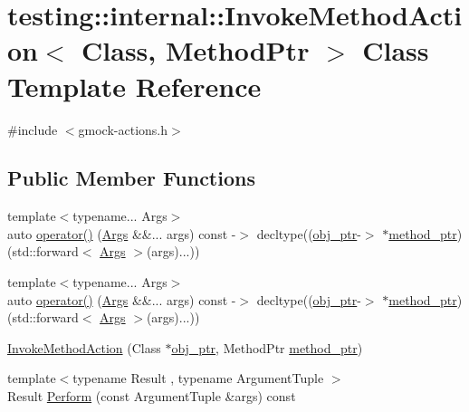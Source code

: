 \hypertarget{structtesting_1_1internal_1_1_invoke_method_action}{}\section{testing\+::internal\+::Invoke\+Method\+Action$<$ Class, Method\+Ptr $>$ Class Template Reference}
\label{structtesting_1_1internal_1_1_invoke_method_action}


{\ttfamily \#include $<$gmock-\/actions.\+h$>$}

\subsection*{Public Member Functions}
\begin{DoxyCompactItemize}
\item 
{\footnotesize template$<$typename... Args$>$ }\\auto \mbox{\hyperlink{structtesting_1_1internal_1_1_invoke_method_action_a152a1d71805ff44a9ad9fcd01a506eb8}{operator()}} (\mbox{\hyperlink{namespacetesting_aaca153f67b689b8b9d5b8c67ecf8cee4}{Args}} \&\&... args) const -\/$>$ decltype((\mbox{\hyperlink{structtesting_1_1internal_1_1_invoke_method_action_ae869b08a351641854e94380227affbc8}{obj\+\_\+ptr}}-\/$>$ $\ast$\mbox{\hyperlink{structtesting_1_1internal_1_1_invoke_method_action_a3101d543f56f7d010fac4d8eaa03acfb}{method\+\_\+ptr}})(std\+::forward$<$ \mbox{\hyperlink{namespacetesting_aaca153f67b689b8b9d5b8c67ecf8cee4}{Args}} $>$(args)...))
\item 
{\footnotesize template$<$typename... Args$>$ }\\auto \mbox{\hyperlink{structtesting_1_1internal_1_1_invoke_method_action_a152a1d71805ff44a9ad9fcd01a506eb8}{operator()}} (\mbox{\hyperlink{namespacetesting_aaca153f67b689b8b9d5b8c67ecf8cee4}{Args}} \&\&... args) const -\/$>$ decltype((\mbox{\hyperlink{structtesting_1_1internal_1_1_invoke_method_action_ae869b08a351641854e94380227affbc8}{obj\+\_\+ptr}}-\/$>$ $\ast$\mbox{\hyperlink{structtesting_1_1internal_1_1_invoke_method_action_a3101d543f56f7d010fac4d8eaa03acfb}{method\+\_\+ptr}})(std\+::forward$<$ \mbox{\hyperlink{namespacetesting_aaca153f67b689b8b9d5b8c67ecf8cee4}{Args}} $>$(args)...))
\item 
\mbox{\hyperlink{structtesting_1_1internal_1_1_invoke_method_action_a16e545f6166e2d54eeafdc2ab3adf06b}{Invoke\+Method\+Action}} (Class $\ast$\mbox{\hyperlink{structtesting_1_1internal_1_1_invoke_method_action_ae869b08a351641854e94380227affbc8}{obj\+\_\+ptr}}, Method\+Ptr \mbox{\hyperlink{structtesting_1_1internal_1_1_invoke_method_action_a3101d543f56f7d010fac4d8eaa03acfb}{method\+\_\+ptr}})
\item 
{\footnotesize template$<$typename Result , typename Argument\+Tuple $>$ }\\Result \mbox{\hyperlink{structtesting_1_1internal_1_1_invoke_method_action_aed6971c668bc2c7671d512306b25b1ab}{Perform}} (const Argument\+Tuple \&args) const
\end{DoxyCompactItemize}
